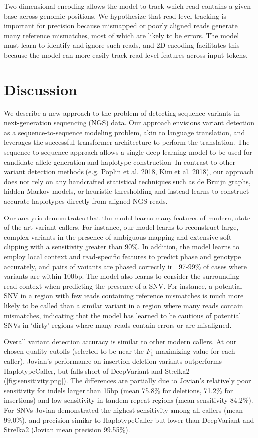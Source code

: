 \documentclass[]{article}
\begin{document}
Two-dimensional encoding allows the model to track which read contains a given base across genomic positions. We hypothesize that read-level tracking is important for precision because mismapped or poorly aligned reads generate many reference mismatches, most of which are likely to be errors. The model must learn to identify and ignore such reads, and 2D encoding facilitates this because the model can more easily track read-level features across input tokens. 
 

\section{Discussion}

We describe a new approach to the problem of detecting sequence variants in next-generation sequencing (NGS) data. Our approach envisions variant detection as a sequence-to-sequence modeling problem, akin to language translation, and leverages the successful transformer architecture to perform the translation. The sequence-to-sequence approach allows a single deep learning model to be used for candidate allele generation and haplotype construction.  In contrast to other variant detection methods (e.g. Poplin et al. 2018,  Kim et al. 2018), our approach does not rely on any handcrafted statistical techniques such as de Bruijn graphs, hidden Markov models, or heuristic thresholding and instead learns to construct accurate haplotypes directly from aligned NGS reads. 
 
Our analysis demonstrates that the model learns many features of modern, state of the art variant callers. For instance, our model learns to reconstruct large, complex variants in the presence of ambiguous mapping and extensive soft clipping with a sensitivity greater than 90\%. In addition, the model learns to employ local context and read-specific features to predict phase and genotype accurately, and pairs of variants are phased correctly in ~97-99\% of cases where variants are within 100bp.  The model also learns to consider the surrounding read context when predicting the presence of a SNV. For instance, a potential SNV in a region with few reads containing reference mismatches is much more likely to be called than a similar variant in a region where many reads contain mismatches, indicating that the model has learned to be cautious of potential SNVs in `dirty' regions where many reads contain errors or are misaligned. 

Overall variant detection accuracy is similar to other modern callers. At our chosen quality cutoffs (selected to be near the $F_1$-maximizing value for each caller), Jovian's performance on insertion-deletion variants outperforms HaplotypeCaller, but falls short of DeepVariant and Strelka2 (\ref{fig:sensitivity.png}). The differences are partially due to Jovian's relatively poor sensitivity for indels larger than 15bp (mean 75.8\% for deletions, 71.2\% for insertions) and low sensitivity in tandem repeat regions (mean sensitivity 84.2\%).  For SNVs Jovian demonstrated the highest sensitivity among all callers (mean 99.0\%), and precision similar to HaplotypeCaller but lower than DeepVariant and Strelka2 (Jovian mean precision 99.55\%). 
\end{document}
